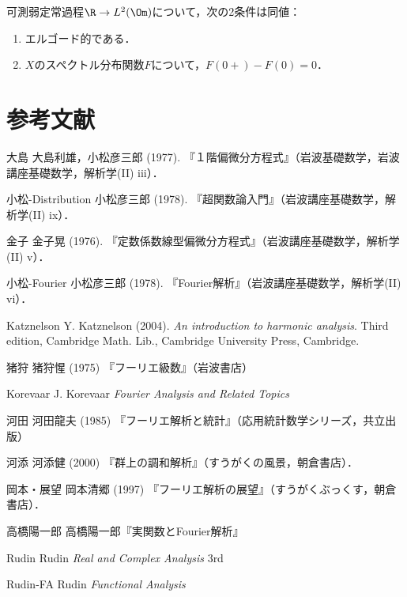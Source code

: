 \documentclass[uplatex,dvipdfmx]{jsreport}
\begin{document}
\begin{theorem}
    可測弱定常過程$\R\to L^2(\Om)$について，次の2条件は同値：
    \begin{enumerate}
        \item エルゴード的である．
        \item $X$のスペクトル分布関数$F$について，$F(0+)-F(0)=0$．
    \end{enumerate}
\end{theorem}

\chapter{参考文献}


\begin{thebibliography}{99}
    \item{大島}
    大島利雄，小松彦三郎 (1977). 『１階偏微分方程式』（岩波基礎数学，岩波講座基礎数学，解析学(II) iii）．
    \item{小松-Distribution}
    小松彦三郎 (1978). 『超関数論入門』（岩波講座基礎数学，解析学(II) ix）．
    \item{金子}
    金子晃 (1976). 『定数係数線型偏微分方程式』（岩波講座基礎数学，解析学(II) v）．
    \item{小松-Fourier}
    小松彦三郎 (1978). 『Fourier解析』（岩波講座基礎数学，解析学(II) vi）．
    \item{Katznelson}
    Y. Katznelson (2004). \textit{An introduction to harmonic analysis}. Third edition, Cambridge Math. Lib., Cambridge University Press, Cambridge.

    \item{猪狩}
    猪狩惺 (1975) 『フーリエ級数』（岩波書店）
    \item{Korevaar}
    J. Korevaar \textit{Fourier Analysis and Related Topics}
    \item{河田}
    河田龍夫 (1985) 『フーリエ解析と統計』（応用統計数学シリーズ，共立出版）
    \item{河添}
    河添健 (2000) 『群上の調和解析』（すうがくの風景，朝倉書店）．
    \item{岡本・展望}
    岡本清郷 (1997) 『フーリエ解析の展望』（すうがくぶっくす，朝倉書店）．
    \item{高橋陽一郎}
    高橋陽一郎『実関数とFourier解析』
    \item{Rudin}
    Rudin \textit{Real and Complex Analysis} 3rd
    \item{Rudin-FA}
    Rudin \textit{Functional Analysis}
\end{thebibliography}
\end{document}
